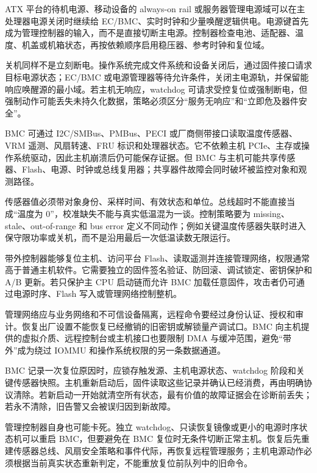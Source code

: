 
ATX 平台的待机电源、移动设备的 always-on rail 或服务器管理电源域可以在主处理器电源关闭时继续给 EC/BMC、实时时钟和少量唤醒逻辑供电。电源键首先成为管理控制器的输入，而不是直接切断主电源。控制器检查电池、适配器、温度、机盖或机箱状态，再按依赖顺序启用稳压器、参考时钟和复位域。

关机同样不是立刻断电。操作系统完成文件系统和设备关闭后，通过固件接口请求目标电源状态；EC/BMC 或电源管理器等待允许条件，关闭主电源轨，并保留能响应唤醒源的最小域。若主机无响应，watchdog 可请求受控复位或强制断电，但强制动作可能丢失未持久化数据，策略必须区分“服务无响应”和“立即危及器件安全”。


BMC 可通过 I2C/SMBus、PMBus、PECI 或厂商侧带接口读取温度传感器、VRM 遥测、风扇转速、FRU 标识和处理器状态。它不依赖主机 PCIe、主存或操作系统驱动，因此主机崩溃后仍可能保存证据。但 BMC 与主机可能共享传感器、Flash、电源、时钟或总线复用器；共享器件故障会同时破坏被监控对象和观测路径。

传感器值必须带对象身份、采样时间、有效状态和单位。总线超时不能直接当成“温度为 0”，校准缺失不能与真实低温混为一谈。控制策略要为 missing、stale、out-of-range 和 bus error 定义不同动作；例如关键温度传感器失联时进入保守限功率或关机，而不是沿用最后一次低温读数无限运行。


带外控制器能够复位主机、访问平台 Flash、读取遥测并连接管理网络，权限通常高于普通主机软件。它需要独立的固件签名验证、防回滚、调试锁定、密钥保护和 A/B 更新。若只保护主 CPU 启动链而允许 BMC 加载任意固件，攻击者仍可通过电源时序、Flash 写入或管理网络控制整机。

管理网络应与业务网络和不可信设备隔离，远程命令要经过身份认证、授权和审计。恢复出厂设置不能恢复已经撤销的旧密钥或解锁量产调试口。BMC 向主机提供的虚拟介质、远程控制台或主机接口也要限制 DMA 与缓冲范围，避免“带外”成为绕过 IOMMU 和操作系统权限的另一条数据通道。


BMC 记录一次复位原因时，应锁存触发源、主机电源状态、watchdog 阶段和关键传感器快照。主机重新启动后，固件读取这些记录并确认已经消费，再由明确协议清除。若新启动一开始就清空所有状态，最有价值的故障证据会在诊断前丢失；若永不清除，旧告警又会被误归因到新故障。

管理控制器自身也可能卡死。独立 watchdog、只读恢复镜像或更小的电源时序状态机可以重启 BMC，但要避免在 BMC 复位时无条件切断正常主机。恢复后先重建传感器总线、风扇安全策略和事件代际，再恢复远程管理服务；主机电源动作必须根据当前真实状态重新判定，不能重放复位前队列中的旧命令。

